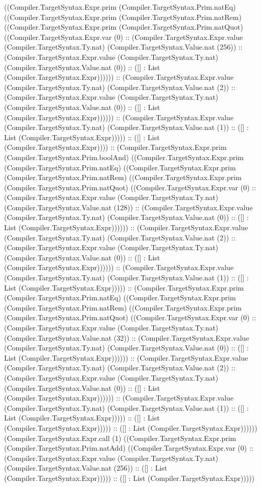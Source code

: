 \documentclass[11pt]{article}
\begin{document}
((Compiler.TargetSyntax.Expr.prim (Compiler.TargetSyntax.Prim.natEq) ((Compiler.TargetSyntax.Expr.prim (Compiler.TargetSyntax.Prim.natRem) ((Compiler.TargetSyntax.Expr.prim (Compiler.TargetSyntax.Prim.natQuot) ((Compiler.TargetSyntax.Expr.var (0) :: (Compiler.TargetSyntax.Expr.value (Compiler.TargetSyntax.Ty.nat) (Compiler.TargetSyntax.Value.nat (256)) :: (Compiler.TargetSyntax.Expr.value (Compiler.TargetSyntax.Ty.nat) (Compiler.TargetSyntax.Value.nat (0)) :: ([] : List (Compiler.TargetSyntax.Expr)))))) :: (Compiler.TargetSyntax.Expr.value (Compiler.TargetSyntax.Ty.nat) (Compiler.TargetSyntax.Value.nat (2)) :: (Compiler.TargetSyntax.Expr.value (Compiler.TargetSyntax.Ty.nat) (Compiler.TargetSyntax.Value.nat (0)) :: ([] : List (Compiler.TargetSyntax.Expr)))))) :: (Compiler.TargetSyntax.Expr.value (Compiler.TargetSyntax.Ty.nat) (Compiler.TargetSyntax.Value.nat (1)) :: ([] : List (Compiler.TargetSyntax.Expr))))) :: ([] : List (Compiler.TargetSyntax.Expr)))) :: (Compiler.TargetSyntax.Expr.prim (Compiler.TargetSyntax.Prim.boolAnd) ((Compiler.TargetSyntax.Expr.prim (Compiler.TargetSyntax.Prim.natEq) ((Compiler.TargetSyntax.Expr.prim (Compiler.TargetSyntax.Prim.natRem) ((Compiler.TargetSyntax.Expr.prim (Compiler.TargetSyntax.Prim.natQuot) ((Compiler.TargetSyntax.Expr.var (0) :: (Compiler.TargetSyntax.Expr.value (Compiler.TargetSyntax.Ty.nat) (Compiler.TargetSyntax.Value.nat (128)) :: (Compiler.TargetSyntax.Expr.value (Compiler.TargetSyntax.Ty.nat) (Compiler.TargetSyntax.Value.nat (0)) :: ([] : List (Compiler.TargetSyntax.Expr)))))) :: (Compiler.TargetSyntax.Expr.value (Compiler.TargetSyntax.Ty.nat) (Compiler.TargetSyntax.Value.nat (2)) :: (Compiler.TargetSyntax.Expr.value (Compiler.TargetSyntax.Ty.nat) (Compiler.TargetSyntax.Value.nat (0)) :: ([] : List (Compiler.TargetSyntax.Expr)))))) :: (Compiler.TargetSyntax.Expr.value (Compiler.TargetSyntax.Ty.nat) (Compiler.TargetSyntax.Value.nat (1)) :: ([] : List (Compiler.TargetSyntax.Expr))))) :: (Compiler.TargetSyntax.Expr.prim (Compiler.TargetSyntax.Prim.natEq) ((Compiler.TargetSyntax.Expr.prim (Compiler.TargetSyntax.Prim.natRem) ((Compiler.TargetSyntax.Expr.prim (Compiler.TargetSyntax.Prim.natQuot) ((Compiler.TargetSyntax.Expr.var (0) :: (Compiler.TargetSyntax.Expr.value (Compiler.TargetSyntax.Ty.nat) (Compiler.TargetSyntax.Value.nat (32)) :: (Compiler.TargetSyntax.Expr.value (Compiler.TargetSyntax.Ty.nat) (Compiler.TargetSyntax.Value.nat (0)) :: ([] : List (Compiler.TargetSyntax.Expr)))))) :: (Compiler.TargetSyntax.Expr.value (Compiler.TargetSyntax.Ty.nat) (Compiler.TargetSyntax.Value.nat (2)) :: (Compiler.TargetSyntax.Expr.value (Compiler.TargetSyntax.Ty.nat) (Compiler.TargetSyntax.Value.nat (0)) :: ([] : List (Compiler.TargetSyntax.Expr)))))) :: (Compiler.TargetSyntax.Expr.value (Compiler.TargetSyntax.Ty.nat) (Compiler.TargetSyntax.Value.nat (1)) :: ([] : List (Compiler.TargetSyntax.Expr))))) :: ([] : List (Compiler.TargetSyntax.Expr))))) :: ([] : List (Compiler.TargetSyntax.Expr)))))) (Compiler.TargetSyntax.Expr.call (1) ((Compiler.TargetSyntax.Expr.prim (Compiler.TargetSyntax.Prim.natAdd) ((Compiler.TargetSyntax.Expr.var (0) :: (Compiler.TargetSyntax.Expr.value (Compiler.TargetSyntax.Ty.nat) (Compiler.TargetSyntax.Value.nat (256)) :: ([] : List (Compiler.TargetSyntax.Expr))))) :: ([] : List (Compiler.TargetSyntax.Expr))))) 
\end{document}
